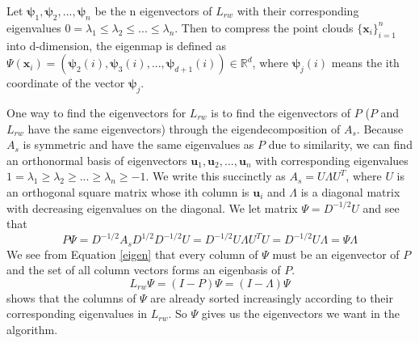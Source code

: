 \documentclass[11pt]{article}
\theoremstyle{definition}
\begin{document}
Let $\boldsymbol{\psi}_1, \boldsymbol{\psi}_2, ..., \boldsymbol{\psi}_n$ be the n eigenvectors of $L_{rw}$ with their corresponding eigenvalues $0 = \lambda_1 \leq \lambda_2 \leq ... \leq \lambda_n$.
Then to compress the point clouds $\{\mathbf{x}_i\}_{i=1}^n$ into d-dimension, the eigenmap is defined as $\Psi(\boldsymbol{x}_i) = (\boldsymbol{\psi}_2(i), \boldsymbol{\psi}_3(i), ..., \boldsymbol{\psi}_{d+1}(i)) \in \mathbb{R}^d$, where $\boldsymbol{\psi}_j(i)$ means the ith coordinate of the vector $\boldsymbol{\psi}_j$.

One way to find the eigenvectors for $L_{rw}$ is to find the eigenvectors of $P$ ($P$ and $L_{rw}$ have the same eigenvectors) through the eigendecomposition of $A_s$. Because $A_s$ is symmetric and have the same eigenvalues as $P$ due to similarity, we can find an orthonormal basis of eigenvectors ${\boldsymbol{u}_1, \boldsymbol{u}_2, ... , \boldsymbol{u}_n}$ with corresponding eigenvalues $1 = \lambda_1 \geq \lambda_2 \geq ... \geq \lambda_n \geq -1$. We write this succinctly as $A_s = U\Lambda U^T$, where $U$ is an orthogonal square matrix whose ith column is $\boldsymbol{u}_i$ and $\Lambda$ is a diagonal matrix with decreasing eigenvalues on the diagonal. We let matrix $\Psi = D^{-1/2}U$ and see that
\begin{equation}
\label{eigen}
P\Psi = D^{-1/2}A_sD^{1/2}D^{-1/2}U = D^{-1/2}U\Lambda U^TU = D^{-1/2}U\Lambda = \Psi\Lambda
\end{equation}
We see from Equation \ref*{eigen} that every column of $\Psi$ must be an eigenvector of $P$ and the set of all column vectors forms an eigenbasis of $P$.
\begin{equation}
L_{rw}\Psi = (I - P)\Psi = (I - \Lambda)\Psi
\end{equation} shows that the columns of $\Psi$ are already sorted increasingly according to their corresponding eigenvalues in $L_{rw}$. So $\Psi$ gives us the eigenvectors we want in the algorithm.
\end{document}
